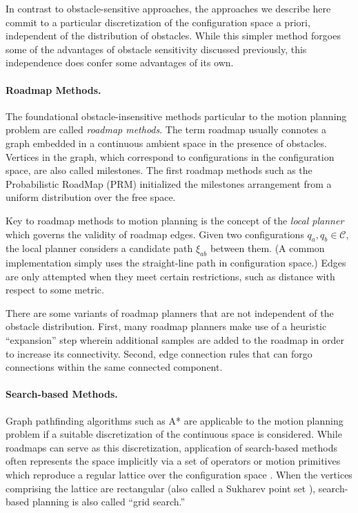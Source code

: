 In contrast to obstacle-sensitive approaches,
the approaches we describe here
commit to a particular discretization
of the configuration space a priori,
independent of the distribution of obstacles.
While this simpler method forgoes some of the advantages of
obstacle sensitivity discussed previously,
this independence does confer some advantages of its own.

\paragraph{Roadmap Methods.}

The foundational obstacle-insensitive methods particular to the motion
planning problem are called \emph{roadmap methods}.
The term roadmap usually connotes a graph embedded in a continuous
ambient space in the presence of obstacles.
Vertices in the graph,
which correspond to configurations in the configuration space,
are also called milestones.
The first roadmap methods such as the
Probabilistic RoadMap (PRM) \citep{kavrakietal1996prm}
initialized the milestones arrangement
from a uniform distribution over the free space.

Key to roadmap methods to motion planning
is the concept of the \emph{local planner}
which governs the validity of roadmap edges.
Given two configurations $q_a, q_b \in \mathcal{C}$,
the local planner considers a candidate path $\xi_{ab}$ between
them.
(A common implementation simply uses the straight-line path
in configuration space.)
Edges are only attempted when they meet certain restrictions,
such as distance with respect to some metric.

There are some variants of roadmap planners that are not independent
of the obstacle distribution.
First,
many roadmap planners make use of a heuristic ``expansion'' step
wherein additional samples are added to the roadmap
in order to increase its connectivity.
Second,
edge connection rules that can forgo connections within
the same connected component.


\paragraph{Search-based Methods.}
Graph pathfinding algorithms such as A* \citep{hart1968astar}
are applicable to the motion planning problem if a suitable
discretization of the continuous space is considered.
While roadmaps can serve as this discretization,
application of search-based methods often represents the space
implicitly via a set of operators or motion primitives
which reproduce a regular lattice over the configuration space
\citep{pivtoraiko2005statelattice}.
When the vertices comprising the lattice are rectangular
(also called a Sukharev point set \citep{sukharev1971extremum}),
search-based planning is also called ``grid search.''

